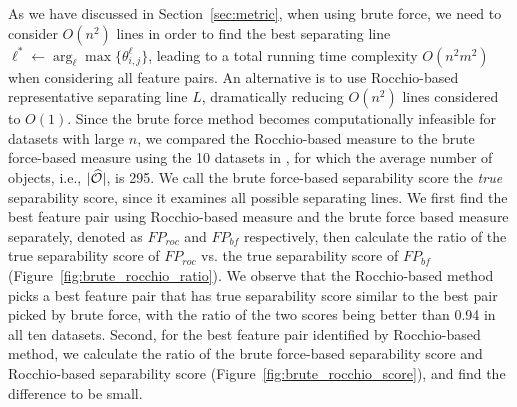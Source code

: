  As we have discussed in Section~\ref{sec:metric}, when using brute force, we need to consider $O(n^2)$ lines in order to find the best separating line $\ell^* \leftarrow \arg_\ell \max \{\theta_{i,j}^{\ell}\}$, leading to a total running time complexity $O(n^2m^2)$ when considering all feature pairs. An alternative is to use Rocchio-based representative separating line $L$, dramatically reducing $O(n^2)$ lines considered to $O(1)$. Since the brute force method becomes computationally infeasible for datasets with large $n$, we compared the Rocchio-based measure to the brute force-based measure using 
the 10 datasets in \msig, for which the average number of objects, i.e., $|\widehat{\oo}|$, is 295. 
We call the brute force-based separability score the {\em true} separability score, since it examines all possible separating lines. We first find the best feature pair using Rocchio-based measure and the brute force based measure separately, denoted as $FP_{roc}$ and $FP_{bf}$ respectively, then calculate the ratio of the true separability score of $FP_{roc}$ vs. the true separability score of $FP_{bf}$ (Figure~\ref{fig:brute_rocchio_ratio}). 
We observe that the Rocchio-based method picks a best feature pair that has true separability score similar to the best pair picked by brute force, with the ratio of the two scores being better than 0.94 in all ten datasets. Second, for the best feature pair identified by Rocchio-based method, we calculate the ratio of the brute force-based separability score and Rocchio-based separability score  (Figure~\ref{fig:brute_rocchio_score}), and find the difference to be small.

